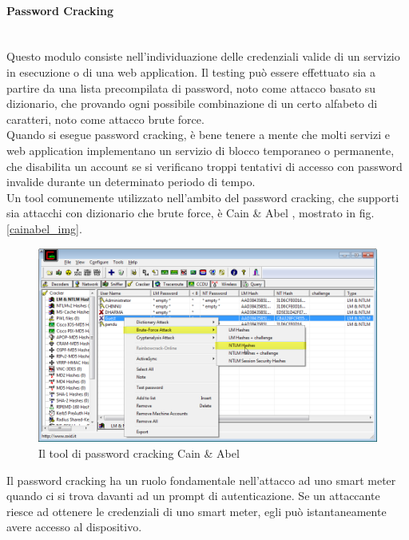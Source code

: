 \paragraph{Password Cracking}\mbox{}\\
Questo modulo consiste nell'individuazione delle credenziali valide di un servizio in esecuzione o di una web application. Il testing può essere effettuato sia a partire da una lista precompilata di password, noto come attacco basato su dizionario, che provando ogni possibile combinazione di un certo alfabeto di caratteri, noto come attacco brute force.\\
Quando si esegue password cracking, è bene tenere a mente che molti servizi e web application implementano un servizio di blocco temporaneo o permanente, che disabilita un account se si verificano troppi tentativi di accesso con password invalide durante un determinato periodo di tempo.\\
Un tool comunemente utilizzato nell'ambito del password cracking, che supporti sia attacchi con dizionario che brute force, è Cain \& Abel \cite{cainabel}, mostrato in fig. \ref{cainabel_img}.\\
\begin{figure}[hbtp]
	\centering
	\includegraphics[scale=.3]{imgs/attack/cainabel.png}
	\caption{Il tool di password cracking Cain \& Abel}
	\label{cainable_img}
\end{figure}
Il password cracking ha un ruolo fondamentale nell'attacco ad uno smart meter quando ci si trova davanti ad un prompt di autenticazione. Se un attaccante riesce ad ottenere le credenziali di uno smart meter, egli può istantaneamente avere accesso al dispositivo.

